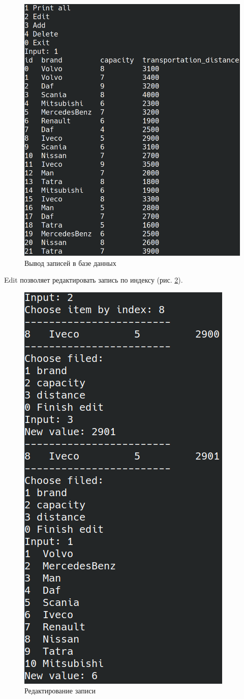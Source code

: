 \begin{figure}[H]
	\centering
	\includegraphics[width=0.7\linewidth]{photo/interface/menu_db_print_all}
	\caption{Вывод записей в базе данных}
	\label{menu_db_print_all}
\end{figure}

Edit позволяет редактировать запись по индексу (рис. \ref{menu_db_edit}).

\begin{figure}[H]
	\centering
	\includegraphics[width=0.7\linewidth]{photo/interface/menu_db_edit}
	\caption{Редактирование записи}
	\label{menu_db_edit}
\end{figure}

